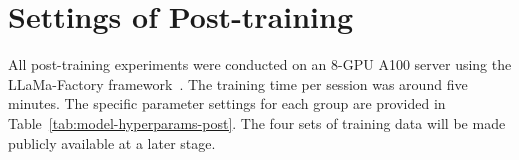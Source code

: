 

\section{Settings of Post-training}

All post-training experiments were conducted on an 8-GPU A100 server using the LLaMa-Factory framework~\citep{zheng2024llamafactory}. The training time per session was around five minutes. The specific parameter settings for each group are provided in Table~\ref{tab:model-hyperparams-post}. The four sets of training data will be made publicly available at a later stage.



